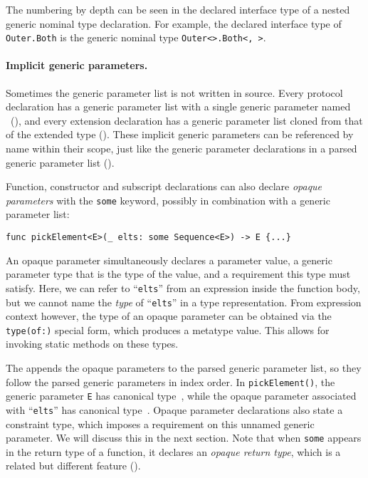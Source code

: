 \documentclass[../generics]{subfiles}
\begin{document}
The numbering by depth can be seen in the declared interface type of a nested generic nominal type declaration. For example, the declared interface type of \texttt{Outer.Both} is the generic nominal type \texttt{Outer<>.Both<, >}.

\paragraph{Implicit generic parameters.} Sometimes the generic parameter list is not written in source. Every protocol declaration has a generic parameter list with a single generic parameter named \IndexSelf\tSelf\ (), and every extension declaration has a generic parameter list cloned from that of the extended type (). These implicit generic parameters can be referenced by name within their scope, just like the generic parameter declarations in a parsed generic parameter list ().

Function, constructor and subscript declarations can also declare \emph{opaque parameters} with the \texttt{some} keyword, possibly in combination with a generic parameter list:
\begin{Verbatim}
func pickElement<E>(_ elts: some Sequence<E>) -> E {...}
\end{Verbatim}
An opaque parameter simultaneously declares a parameter value, a generic parameter type that is the type of the value, and a requirement this type must satisfy. Here, we can refer to ``\texttt{elts}'' from an expression inside the function body, but we cannot name the \emph{type} of ``\texttt{elts}'' in a type representation. From expression context however, the type of an opaque parameter can be obtained via the \texttt{type(of:)} special form, which produces a metatype value. This allows for invoking static methods on these types.

The  appends the opaque parameters to the parsed generic parameter list, so they follow the parsed generic parameters in index order. In \texttt{pickElement()}, the generic parameter \texttt{E} has canonical type~\rT, while the opaque parameter associated with ``\texttt{elts}'' has canonical type~\rU. Opaque parameter declarations also state a constraint type, which imposes a requirement on this unnamed generic parameter. We will discuss this in the next section. Note that when \texttt{some} appears in the return type of a function, it declares an \emph{opaque return type}, which is a related but different feature ().
\end{document}
